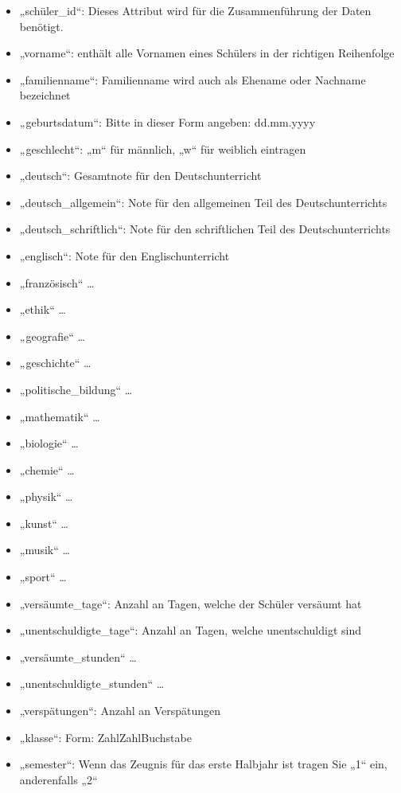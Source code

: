 \documentclass[a4paper,10pt]{scrartcl}
\begin{document}
      \begin{itemize}
         \item „schüler\_id“: Dieses Attribut wird für die Zusammenführung der Daten benötigt.
         \item „vorname“: enthält alle Vornamen eines Schülers in der richtigen Reihenfolge
         \item „familienname“: Familienname wird auch als Ehename oder Nachname bezeichnet
         \item „geburtsdatum“: Bitte in dieser Form angeben: dd.mm.yyyy
         \item „geschlecht“: „m“ für männlich, „w“ für weiblich eintragen
         \item „deutsch“: Gesamtnote für den Deutschunterricht
         \item „deutsch\_allgemein“: Note für den allgemeinen Teil des Deutschunterrichts
         \item „deutsch\_schriftlich“: Note für den schriftlichen Teil des Deutschunterrichts
         \item „englisch“: Note für den Englischunterricht
         \item „französisch“ …
         \item „ethik“ …
         \item „geografie“ …
         \item „geschichte“ …
         \item „politische\_bildung“ …
         \item „mathematik“ …
         \item „biologie“ …
         \item „chemie“ …
         \item „physik“ …
         \item „kunst“ …
	 \item „musik“ …
         \item „sport“ …
         \item „versäumte\_tage“: Anzahl an Tagen, welche der Schüler versäumt hat
         \item „unentschuldigte\_tage“: Anzahl an Tagen, welche unentschuldigt sind
         \item „versäumte\_stunden“ …
         \item „unentschuldigte\_stunden“ …
         \item „verspätungen“: Anzahl an Verspätungen
         \item „klasse“: Form: ZahlZahlBuchstabe
         \item „semester“: Wenn das Zeugnis für das erste Halbjahr ist tragen Sie „1“ ein, anderenfalls „2“

\end{itemize}
\end{document}
